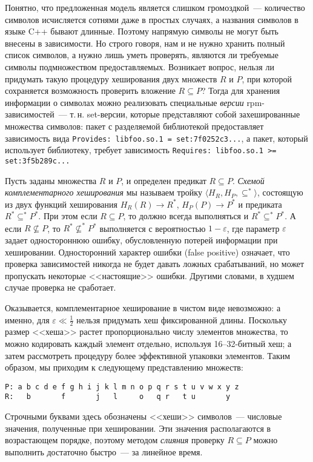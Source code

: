 \documentclass[russian,a4paper,12pt,titlepage]{article}
\begin{document}
Понятно, что предложенная модель является слишком громоздкой~--- количество символов исчисляется сотнями даже в простых случаях,
а названия символов в языке C++ бывают длинные.  Поэтому напрямую символы не могут быть внесены в зависимости.
Но строго говоря, нам и не нужно хранить полный список символов, а нужно лишь уметь проверять, являются ли требуемые
символы подмножеством предоставляемых.  Возникает вопрос, нельзя ли придумать такую процедуру хеширования двух
множеств $R$ и $P$, при которой сохраняется возможность проверить вложение $R\subseteq P$?
Тогда для хранения информации о символах можно реализовать
специальные \emph{версии} rpm-зависимостей~--- т.\,н. set-версии, которые представляют собой захешированные множества символов:
пакет с разделяемой библиотекой предоставляет зависимость вида \verb|Provides: libfoo.so.1 = set:7f0252c3...|,
а пакет, который использует библиотеку, требует зависимость \verb|Requires: libfoo.so.1 >= set:3f5b289c...|

Пусть заданы множества $R$ и $P$, и определен предикат $R\subseteq P$.
\emph{Схемой комплементарного хеширования} мы называем тройку $\langle H_R, H_P, \subseteq^*\rangle$,
состоящую из двух функций хеширования $H_R(R)\to R^*$, $H_P(P)\to P^*$ и
предиката $R^*\subseteq^*P^*$.  При этом если $R\subseteq P$, то должно всегда
выполняться и $R^*\subseteq^*P^*$. А если $R\not\subseteq P$, то $R^*\not\subseteq^*P^*$
выполняется с вероятностью $1-\varepsilon$, где параметр $\varepsilon$ задает одностороннюю ошибку,
обусловленную потерей информации при хешировании.  Односторонний характер ошибки (false positive) означает,
что проверка зависимостей никогда не будет давать ложных срабатываний, но может пропускать некоторые <<настоящие>> ошибки.
Другими словами, в худшем случае проверка не сработает.

Оказывается, комплементарное хеширование в чистом виде невозможно: а именно,
для $\varepsilon\ll\frac{1}{2}$ нельзя придумать хеш фиксированной длины.
Поскольку размер <<хеша>> растет пропорционально числу элементов множества,
то можно кодировать каждый элемент отдельно, используя 16--32-битный хеш;
а затем рассмотреть процедуру более эффективной упаковки элементов.
Таким образом, мы приходим к следующему представлению множеств:
\begin{verbatim}
P: a b c d e f g h i j k l m n o p q r s t u v w x y z
R:   b       f       j   l     o   q r   t u       y
\end{verbatim}
Строчными буквами здесь обозначены <<хеши>> символов~--- числовые значения, полученные при хешировании.
Эти значения располагаются в возрастающем порядке, поэтому методом \emph{слияния} проверку $R\subseteq P$
можно выполнить достаточно быстро~--- за линейное время.
\end{document}
